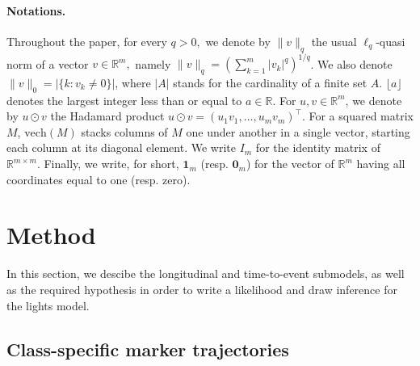 \documentclass[11pt]{article}
\newcommand{\norm}[1]{\|#1\|}
\newcommand{\R}{\mathds R}
\begin{document}
\paragraph{Notations.}

Throughout the paper, for every $q > 0,$ we denote by $\norm{v}_q$ the usual $\ell_q$-quasi norm of a vector $v \in \R^m,$ namely $\norm{v}_q =(\sum_{k=1}^m|v_k|^q)^{1/q}$. We also denote $\norm{v}_0 = |\{k : v_k \neq 0\}|$, where $|A|$ stands for the cardinality of a finite set $A$. $\lfloor a \rfloor$ denotes the largest integer less than or equal to $a \in \R$.
For $u, v \in \R^m$, we denote by $u \odot v$ the Hadamard product $u\odot v =(u_1v_1, \ldots, u_mv_m)^\top.$ 
For a squared matrix $M$, $\text{vech}(M)$ stacks columns of $M$ one under another in a single vector, starting each column at its diagonal element. We write $I_m$ for the identity matrix of $\R^{m \times m}$.
Finally, we write, for short, $\mathbf{1}_m$  (resp. $\mathbf{0}_m$) for the vector of $\R^m$ having all coordinates equal to one (resp. zero).


\section{Method}
\label{sec:Method}

In this section, we descibe the longitudinal and time-to-event submodels, as well as the required hypothesis in order to write a likelihood and draw inference for the lights model.

\subsection{Class-specific marker trajectories}
\end{document}
